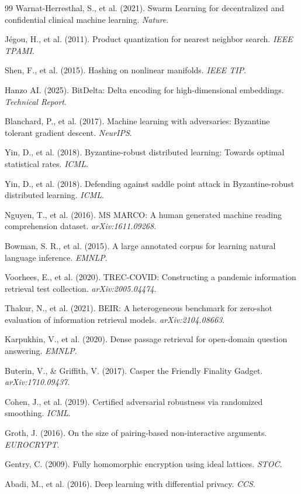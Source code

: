 \begin{thebibliography}{99}
Warnat-Herresthal, S., et al. (2021). Swarm Learning for decentralized and confidential clinical machine learning. \textit{Nature}.

Jégou, H., et al. (2011). Product quantization for nearest neighbor search. \textit{IEEE TPAMI}.

Shen, F., et al. (2015). Hashing on nonlinear manifolds. \textit{IEEE TIP}.

Hanzo AI. (2025). BitDelta: Delta encoding for high-dimensional embeddings. \textit{Technical Report}.

Blanchard, P., et al. (2017). Machine learning with adversaries: Byzantine tolerant gradient descent. \textit{NeurIPS}.

Yin, D., et al. (2018). Byzantine-robust distributed learning: Towards optimal statistical rates. \textit{ICML}.

Yin, D., et al. (2018). Defending against saddle point attack in Byzantine-robust distributed learning. \textit{ICML}.

Nguyen, T., et al. (2016). MS MARCO: A human generated machine reading comprehension dataset. \textit{arXiv:1611.09268}.

Bowman, S. R., et al. (2015). A large annotated corpus for learning natural language inference. \textit{EMNLP}.

Voorhees, E., et al. (2020). TREC-COVID: Constructing a pandemic information retrieval test collection. \textit{arXiv:2005.04474}.

Thakur, N., et al. (2021). BEIR: A heterogeneous benchmark for zero-shot evaluation of information retrieval models. \textit{arXiv:2104.08663}.

Karpukhin, V., et al. (2020). Dense passage retrieval for open-domain question answering. \textit{EMNLP}.

Buterin, V., \& Griffith, V. (2017). Casper the Friendly Finality Gadget. \textit{arXiv:1710.09437}.

Cohen, J., et al. (2019). Certified adversarial robustness via randomized smoothing. \textit{ICML}.

Groth, J. (2016). On the size of pairing-based non-interactive arguments. \textit{EUROCRYPT}.

Gentry, C. (2009). Fully homomorphic encryption using ideal lattices. \textit{STOC}.

Abadi, M., et al. (2016). Deep learning with differential privacy. \textit{CCS}.

\end{thebibliography}


